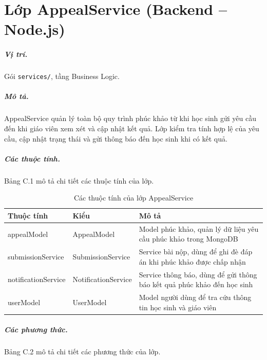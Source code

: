 \documentclass[../DoAn.tex]{subfiles}
\begin{document}
\section{Lớp AppealService (Backend -- Node.js)}
\label{appendix:appeal_service}

\subparagraph{Vị trí.} Gói \texttt{services/}, tầng Business Logic.

\subparagraph{Mô tả.} AppealService quản lý toàn bộ quy trình phúc khảo từ khi học sinh gửi yêu cầu đến khi giáo viên xem xét và cập nhật kết quả. Lớp kiểm tra tính hợp lệ của yêu cầu, cập nhật trạng thái và gửi thông báo đến học sinh khi có kết quả.

\subparagraph{Các thuộc tính.} Bảng C.1 mô tả chi tiết các thuộc tính của lớp.

\begin{table}[H]
\centering
\begin{tabular}{|p{4cm}|p{3.5cm}|p{5cm}|}
\hline
\textbf{Thuộc tính} & \textbf{Kiểu} & \textbf{Mô tả} \\ \hline
appealModel & AppealModel & Model phúc khảo, quản lý dữ liệu yêu cầu phúc khảo trong MongoDB \\ \hline
submissionService & SubmissionService & Service bài nộp, dùng để ghi đè đáp án khi phúc khảo được chấp nhận \\ \hline
notificationService & NotificationService & Service thông báo, dùng để gửi thông báo kết quả phúc khảo đến học sinh \\ \hline
userModel & UserModel & Model người dùng để tra cứu thông tin học sinh và giáo viên \\ \hline
\end{tabular}
\caption{Các thuộc tính của lớp AppealService}
\label{table:appeal_service_attrs}
\end{table}

\subparagraph{Các phương thức.} Bảng C.2 mô tả chi tiết các phương thức của lớp.
\end{document}
